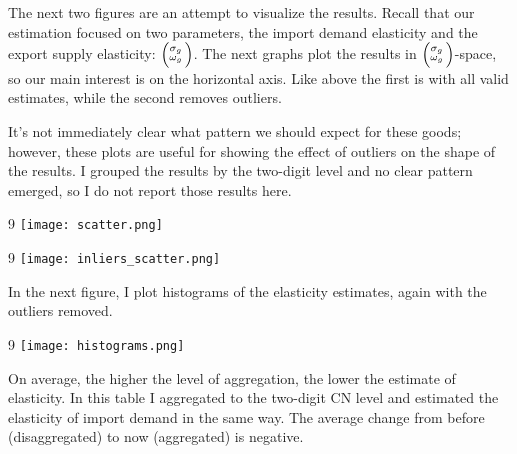 \documentclass[12pt,a4paper]{article}                      %
\begin{document}
\newpage

The next two figures are an attempt to visualize the results.
Recall that our estimation focused on two parameters, the import demand elasticity and the export supply elasticity: $\Bigl(\negthinspace\begin{smallmatrix}\sigma_g\\\omega_g\end{smallmatrix}\Bigr)$.
The next graphs plot the results in $\Bigl(\negthinspace\begin{smallmatrix}\sigma_g\\\omega_g\end{smallmatrix}\Bigr)$-space, so our main interest is on the horizontal axis.
Like above the first is with all valid estimates, while the second removes outliers.

It's not immediately clear what pattern we should expect for these goods;
however, these plots are useful for showing the effect of outliers on the shape of the results.
I grouped the results by the two-digit level and no clear pattern emerged, so I do not report those results here.

\begin{landscape}
\thispagestyle{empty}
\begin{center}
\footnotesize 9
    \texttt{[image: scatter.png]}
\end{center}
\end{landscape}
\restoregeometry


\begin{landscape}
\thispagestyle{empty}
\begin{center}
\footnotesize 9
    \texttt{[image: inliers\_scatter.png]}
\end{center}
\end{landscape}
\restoregeometry

In the next figure, I plot histograms of the elasticity estimates, again with the outliers removed.

\begin{landscape}
\thispagestyle{empty}
\begin{center}
\footnotesize 9
    \texttt{[image: histograms.png]}
\end{center}
\end{landscape}
\restoregeometry

On average, the higher the level of aggregation, the lower the estimate of elasticity.
In this table I aggregated to the two-digit CN level and estimated the elasticity of import demand in the same way.
The average change from before (disaggregated) to now (aggregated) is negative.\\

\noindent
\label{tab:two_means}
\end{document}
